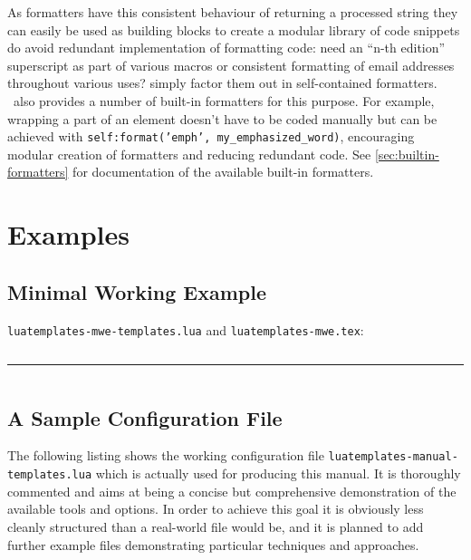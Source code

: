 \documentclass[12pt]{scrartcl}
\begin{document}
\medskip As formatters have this consistent behaviour of returning a processed
string they can easily be used as building blocks to create a modular library of
code snippets do avoid redundant implementation of formatting code: need an
“n-th edition” superscript as part of various macros or consistent formatting of
email addresses throughout various uses? simply factor them out in
self-contained formatters.  \luatemplates\ also provides a number of
built-in formatters for this purpose.  For example, wrapping a part of an
element \texttt{\emph{}} doesn't have to be coded manually but can be
achieved with \texttt{self:format('emph', my_emphasized_word)},
encouraging modular creation of formatters and reducing redundant code.  See
\vref{sec:builtin-formatters} for documentation of the available built-in
formatters.

\section{Examples}
\label{sec:examples}

\subsection{Minimal Working Example}
\label{sec:mwe}

\noindent
\texttt{luatemplates-mwe-templates.lua} and \texttt{luatemplates-mwe.tex}:

\inputminted{lua}{examples/luatemplates-mwe-templates.lua}

\hrule

\inputminted{tex}{examples/luatemplates-mwe.tex}





\subsection{A Sample Configuration File}
\label{sec:examples:manual-templates}

The following listing shows the working configuration file
\texttt{luatemplates-manual-templates.lua} which is actually used for producing
this manual. It is thoroughly commented and aims at being a concise but
comprehensive demonstration of the available tools and options.  In order to
achieve this goal it is obviously less cleanly structured than a real-world file
would be, and it is planned to add further example files demonstrating
particular techniques and approaches.
\end{document}

